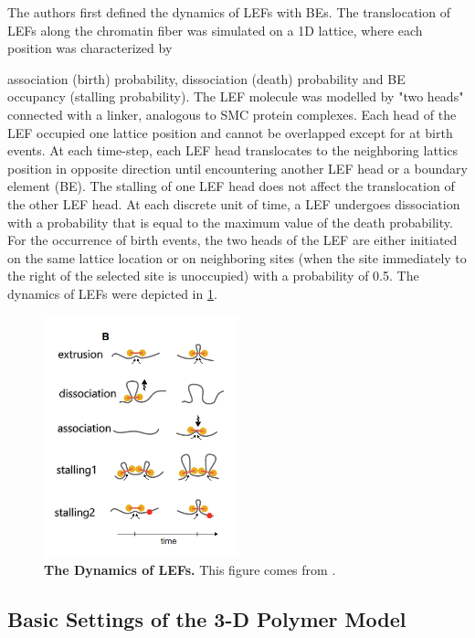 \documentclass[11pt]{article}
\begin{document}
The authors first defined the dynamics of LEFs with BEs. The translocation of LEFs along the chromatin fiber was simulated on a 1D lattice, where each position was characterized by {association (birth) probability, dissociation (death) probability and BE occupancy (stalling probability). The LEF molecule was modelled by "two heads" connected with a linker, analogous to SMC protein complexes. Each head of the LEF occupied one lattice position and cannot be overlapped except for at birth events. At each time-step, each LEF head translocates to the neighboring lattics position in opposite direction until encountering another LEF head or a boundary element (BE). The stalling of one LEF head does not affect the translocation of the other LEF head.
At each discrete unit of time, a LEF undergoes dissociation with a probability that is equal to the maximum value of the death probability. For the occurrence of birth events, the two heads of the LEF are either initiated on the same lattice location or on neighboring sites (when the site immediately to the right of the selected site is unoccupied) with a probability of 0.5. The dynamics of LEFs were depicted in \cref{fig:LEF dynamics}.

\begin{figure}[htbp]
  \centering
  \includegraphics[width=0.5\textwidth]{assets/image-20221212095109951.png}
  \caption{\textbf{The Dynamics of LEFs.} This figure comes from \cite{fudenberg_formation_2016}.}
  \label{fig:LEF dynamics}
\end{figure}

\subsection{Basic Settings of the 3-D Polymer Model}

}
\end{document}
